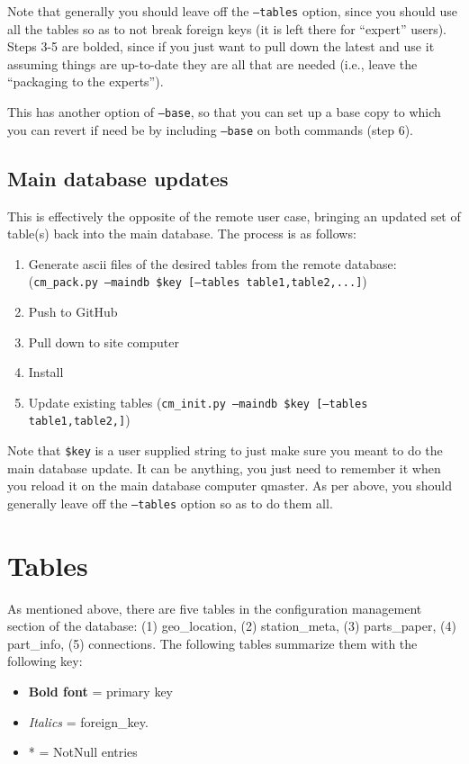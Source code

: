\documentclass{article}[10pt]
\begin{document}
Note that generally you should leave off the {\tt --tables} option, since you should use all the tables so as to not break foreign keys (it is left there for ``expert'' users).  Steps 3-5 are bolded, since if you just want to pull down the latest and use it assuming things are up-to-date they are all that are needed (i.e., leave the ``packaging to the experts'').

This has another option of {\tt --base}, so that you can set up a base copy to which you can revert if need be by including {\tt --base} on both commands (step 6).

\subsection{Main database updates}
This is effectively the opposite of the remote user case, bringing an updated set of table(s) back into the main database.  The process is as follows:
\begin{enumerate}\setlength\itemsep{-.3em}
	\item  Generate ascii files of the desired tables from the remote database:
		({\tt cm\_pack.py --maindb \$key [--tables table1,table2,...]})
	\item Push to GitHub
	\item Pull down to site computer
	\item Install
	\item Update existing tables  ({\tt cm\_init.py --maindb \$key [--tables table1,table2,]})
\end{enumerate}

Note that {\tt \$key} is a user supplied string to just make sure you meant to do the main database update.  It can be anything, you
just need to remember it when you reload it on the main database computer qmaster.
As per above, you should generally leave off the {\tt --tables} option so as to do them all.

\section{Tables}
As mentioned above, there are five tables in the configuration management section of the database:  (1) geo\_location, (2) station\_meta,
(3) parts\_paper, (4) part\_info, (5) connections.  The following tables summarize them with the following key:
\begin{itemize}\setlength\itemsep{-.3em}
	\item {\bf Bold font} = primary key
	\item {\em Italics} = foreign\_key.
	\item * = NotNull entries
\end{itemize}
\end{document}
